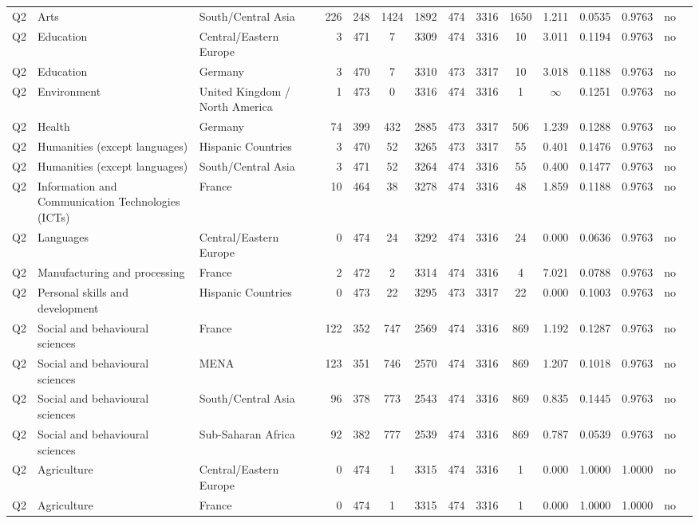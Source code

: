 \begin{longtable}{lllrcccccccccll}
Q2 & Arts & South/Central Asia & 226 & 248 & 1424 & 1892 & 474 & 3316 & 1650 & 1.211 & 0.0535 & 0.9763 & no \\
Q2 & Education & Central/Eastern Europe & 3 & 471 & 7 & 3309 & 474 & 3316 & 10 & 3.011 & 0.1194 & 0.9763 & no \\
Q2 & Education & Germany & 3 & 470 & 7 & 3310 & 473 & 3317 & 10 & 3.018 & 0.1188 & 0.9763 & no \\
Q2 & Environment & United Kingdom / North America & 1 & 473 & 0 & 3316 & 474 & 3316 & 1 & $\infty$ & 0.1251 & 0.9763 & no \\
Q2 & Health & Germany & 74 & 399 & 432 & 2885 & 473 & 3317 & 506 & 1.239 & 0.1288 & 0.9763 & no \\
Q2 & Humanities (except languages) & Hispanic Countries & 3 & 470 & 52 & 3265 & 473 & 3317 & 55 & 0.401 & 0.1476 & 0.9763 & no \\
Q2 & Humanities (except languages) & South/Central Asia & 3 & 471 & 52 & 3264 & 474 & 3316 & 55 & 0.400 & 0.1477 & 0.9763 & no \\
Q2 & Information and Communication Technologies (ICTs) & France & 10 & 464 & 38 & 3278 & 474 & 3316 & 48 & 1.859 & 0.1188 & 0.9763 & no \\
Q2 & Languages & Central/Eastern Europe & 0 & 474 & 24 & 3292 & 474 & 3316 & 24 & 0.000 & 0.0636 & 0.9763 & no \\
Q2 & Manufacturing and processing & France & 2 & 472 & 2 & 3314 & 474 & 3316 & 4 & 7.021 & 0.0788 & 0.9763 & no \\
Q2 & Personal skills and development & Hispanic Countries & 0 & 473 & 22 & 3295 & 473 & 3317 & 22 & 0.000 & 0.1003 & 0.9763 & no \\
Q2 & Social and behavioural sciences & France & 122 & 352 & 747 & 2569 & 474 & 3316 & 869 & 1.192 & 0.1287 & 0.9763 & no \\
Q2 & Social and behavioural sciences & MENA & 123 & 351 & 746 & 2570 & 474 & 3316 & 869 & 1.207 & 0.1018 & 0.9763 & no \\
Q2 & Social and behavioural sciences & South/Central Asia & 96 & 378 & 773 & 2543 & 474 & 3316 & 869 & 0.835 & 0.1445 & 0.9763 & no \\
Q2 & Social and behavioural sciences & Sub-Saharan Africa & 92 & 382 & 777 & 2539 & 474 & 3316 & 869 & 0.787 & 0.0539 & 0.9763 & no \\
Q2 & Agriculture & Central/Eastern Europe & 0 & 474 & 1 & 3315 & 474 & 3316 & 1 & 0.000 & 1.0000 & 1.0000 & no \\
Q2 & Agriculture & France & 0 & 474 & 1 & 3315 & 474 & 3316 & 1 & 0.000 & 1.0000 & 1.0000 & no \\

\end{longtable}
